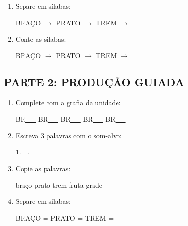 \begin{exercicio}
\begin{enumerate}
  \item Separe em sílabas:
  \begin{center}
  BRAÇO $\rightarrow$ \underline{\hspace{1cm}} \quad PRATO $\rightarrow$ \underline{\hspace{1cm}} \quad TREM $\rightarrow$ \underline{\hspace{1cm}}
  \end{center}

  \item Conte as sílabas:
  \begin{center}
  BRAÇO $\rightarrow$ \underline{\hspace{0.9cm}} \quad PRATO $\rightarrow$ \underline{\hspace{0.9cm}} \quad TREM $\rightarrow$ \underline{\hspace{0.9cm}}
  \end{center}

\end{enumerate}

\subsection*{PARTE 2: PRODUÇÃO GUIADA}

\begin{enumerate}[resume]

  \item Complete com a grafia da unidade:
  \begin{center}
  BR\underline{~~~} \quad BR\underline{~~~} \quad BR\underline{~~~} \quad BR\underline{~~~} \quad BR\underline{~~~}
  \end{center}

  \item Escreva 3 palavras com o som-alvo:
  \begin{center}
  1. \underline{\hspace{3cm}} . \underline{\hspace{3cm}} . \underline{\hspace{3cm}}
  \end{center}

  \item Copie as palavras:
  \begin{center}
  braço \quad prato \quad trem \quad fruta \quad grade
  \end{center}

  \item Separe em sílabas:
  \begin{center}
  BRAÇO = \underline{\hspace{1cm}} \underline{\hspace{1cm}} \quad PRATO = \underline{\hspace{1cm}} \underline{\hspace{1cm}} \quad TREM = \underline{\hspace{1cm}} \underline{\hspace{1cm}}
  \end{center}


\end{enumerate}
\end{exercicio}
